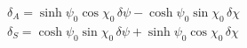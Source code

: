 \begin{equation}
\begin{array}{l}
\delta_A=\sinh\psi_0\cos\chi_0\,\delta\psi-\cosh\psi_0\sin\chi_0\,\delta\chi
\\
\delta_S=\cosh\psi_0\sin\chi_0\,\delta\psi+\sinh\psi_0\cos\chi_0\,\delta\chi
\end{array}
\end{equation}

